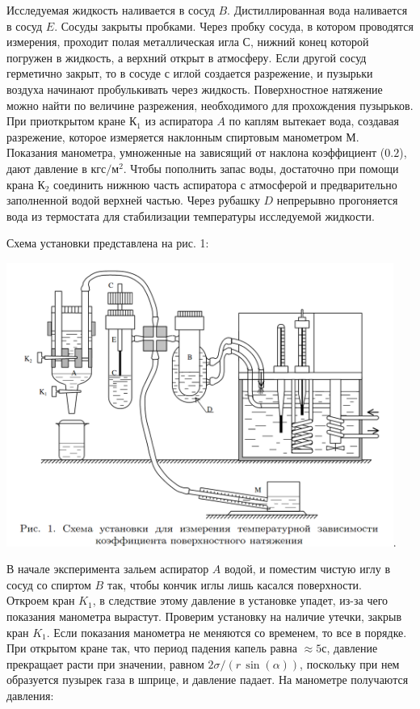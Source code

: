 Исследуемая жидкость наливается в сосуд $B$. Дистиллированная вода наливается в сосуд $E$. Сосуды закрыты пробками. Через пробку сосуда, в котором проводятся измерения, проходит полая металлическая игла $С$, нижний конец которой погружен в жидкость, а верхний открыт в атмосферу. Если другой сосуд герметично закрыт, то в сосуде с иглой создается разрежение, и пузырьки воздуха начинают пробулькивать через жидкость. Поверхностное натяжение можно найти по величине разрежения, необходимого для прохождения пузырьков. При приоткрытом кране $\text{К}_1$ из аспиратора $A$ по каплям вытекает вода, создавая разрежение, которое измеряется наклонным спиртовым манометром $М$. Показания манометра, умноженные на зависящий от наклона коэффициент ($0.2$), дают давление в $\text{кгс}/\text{м}^2$. Чтобы пополнить запас воды, достаточно при помощи крана $\text{К}_2$ соединить нижнюю часть аспиратора с атмосферой и предварительно заполненной водой верхней частью. Через рубашку $D$ непрерывно прогоняется вода из термостата для стабилизации температуры исследуемой жидкости.

\newpage
Схема установки представлена на рис. 1:
\begin{center}
\includegraphics[width=0.95\textwidth]{equip.png}.
\end{center}
\newpage

В начале эксперимента зальем аспиратор $A$ водой, и поместим чистую иглу в сосуд со спиртом $B$ так, чтобы кончик иглы лишь касался поверхности.\\
Откроем кран $K_1$, в следствие этому давление в установке упадет, из-за чего показания манометра вырастут. Проверим установку на наличие утечки, закрыв кран $K_1$. Если показания манометра не меняются со временем, то все в порядке.\\
При открытом кране так, что период падения капель равна $\approx 5 \text{с}$, давление прекращает расти при значении, равном $2\sigma/(r\,\sin(\alpha))$, поскольку при нем образуется пузырек газа в шприце, и давление падает. На манометре получаются давления:\\

